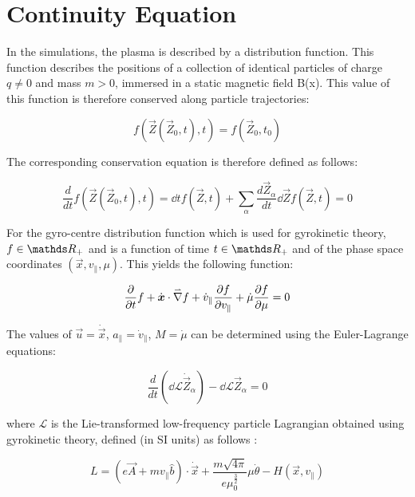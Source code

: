 \section{Continuity Equation}

In the simulations, the plasma is described by a distribution function. This function describes the positions of a collection of identical particles of charge $q\neq 0$ and mass $m > 0$, immersed in a static magnetic field B(x). This value of this function is therefore conserved along particle trajectories\cite{MonteCarloBottino}:

\begin{equation}
 f\left(\vec{Z}\left(\vec{Z}_0,t\right),t\right) = f\left(\vec{Z}_0,t_0\right)
\end{equation}

The corresponding conservation equation is therefore defined as follows:

\begin{equation}
 \frac{d}{dt} f\left(\vec{Z}\left(\vec{Z}_0,t\right),t\right) = \dd{}{t}f\left(\vec{Z},t\right) + \underset{\alpha}{\sum} \frac{d\vec{Z}_\alpha}{dt}\dd{}{\vec{Z}}f\left(\vec{Z},t\right) = 0
\end{equation}

For the gyro-centre distribution function which is used for gyrokinetic theory, $f\in\reel_+$ and is a function of time $t\in\reel_+$ and of the phase space coordinates $\left(\vec{x},v_\parallel,\mu\right)$. This yields the following function:

\begin{equation}\label{eq::conservation general}
 \frac{\partial }{\partial t}f + \dot{\boldsymbol{x}}\cdot\accentset{\rightharpoonup}{\nabla} f + \dot{v}_\parallel \frac{\partial f}{\partial v_\parallel} + \dot{\mu} \frac{\partial f}{\partial \mu} = 0
\end{equation}

The values of $\vec{u}=\dot{\vec{x}}$, $a_\parallel=\dot{v}_\parallel$, $M=\dot{\mu}$ can be determined using the Euler-Lagrange equations:

\begin{equation}
 \frac{d}{dt}\left(\dd{\mathcal{L}}{\dot{\vec{Z}}_\alpha}\right)-\dd{\mathcal{L}}{\vec{Z}_\alpha}=0
\end{equation}

where $\mathcal{L}$ is the Lie-transformed low-frequency particle Lagrangian obtained using gyrokinetic theory, defined (in SI units) as follows \cite{MonteCarloBottino}:

\begin{equation}
 L=\left(e\vec{A}+mv_\parallel\hat{b}\right)\cdot\dot{\vec{x}}+\frac{m\sqrt{4\pi}}{e\mu_0^{\frac{3}{2}}}\mu\dot{\theta}-H\left(\vec{x},v_\parallel\right)
\end{equation}

